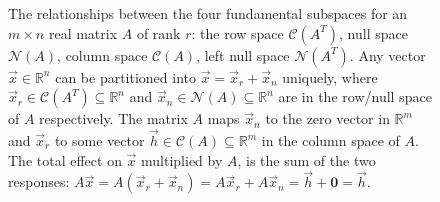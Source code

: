 \begin{figure}
    \caption{The relationships between the four fundamental subspaces for an $m \times n$ real matrix $A$ of rank $r$: the row space $\mathcal{C}(A^T)$, null space $\mathcal{N}(A)$, column space $\mathcal{C}(A)$, left null space $\mathcal{N}(A^T)$. Any vector $\vec{x} \in \mathbb{R}^n$ can be partitioned into $\vec{x} = \vec{x}_r + \vec{x}_n$ uniquely, where $\vec{x}_r \in \mathcal{C}(A^T) \subseteq \mathbb{R}^n$ and $\vec{x}_n \in \mathcal{N}(A) \subseteq \mathbb{R}^n$ are in the row/null space of $A$ respectively. The matrix $A$ maps $\vec{x}_n$ to the zero vector in $\mathbb{R}^m$ and $\vec{x}_r$ to some vector $\vec{h} \in \mathcal{C}(A) \subseteq \mathbb{R}^m$ in the column space of $A$. The total effect on $\vec{x}$ multiplied by $A$, is the sum of the two responses: $A\vec{x} = A(\vec{x}_r + \vec{x}_n) = A\vec{x}_r + A\vec{x}_n = \vec{h} + \textbf{0} = \vec{h}$.}
    \label{fig:foursubspaces}
\end{figure}

